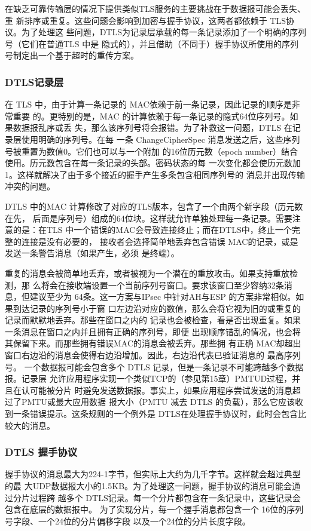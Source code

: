 在缺乏可靠传输层的情况下提供类似TLS服务的主要挑战在于数据报可能会丢失、重
新排序或重复。这些问题会影响到加密与握手协议，这两者都依赖于 TLS协议。为了处理这
些问题，DTLS为记录层承载的每一条记录添加了一个明确的序列号（它们在普通TLS 中是
隐式的），并且借助（不同于）握手协议所使用的序列号制定出一个基于超时的重传方案。
\subsubsection{DTLS记录层}
在 TLS 中，由于计算一条记录的 MAC依赖于前一条记录，因此记录的顺序是非常重要
的。更特别的是，MAC 的计算依赖于每一条记录的隐式64位序列号。如果数据报乱序或丢
失，那么该序列号将会报错。为了补救这一问题，DTLS 在记录层使用明确的序列号。在每
一条 ChangeCipherSpec 消息发送之后，这些序列号被重置为数值0。它们也可以与一个附加
的16位历元数（epoch number）结合使用。历元数包含在每一条记录的头部。密码状态的每
一次变化都会使历元数加1。这样就解决了由于多个接近的握手产生多条包含相同序列号的
消息并出现传输冲突的问题。

DTLS 中的MAC 计算修改了对应的TLS版本，包含了一个由两个新字段（历元数在先，
后面是序列号）组成的64位块。这样就允许单独处理每一条记录。需要注意的是：在TLS
中一个错误的MAC会导致连接终止；而在DTLS中，终止一个完整的连接是没有必要的，
接收者会选择简单地丢弃包含错误 MAC的记录，或是发送一条警告消息（如果产生，必须
是终端）。

重复的消息会被简单地丢弃，或者被视为一个潜在的重放攻击。如果支持重放检测，那
么将会在接收端设置一个当前序列号窗口。要求该窗口至少容纳32条消息，但建议至少为
64条。这一方案与IPsec 中针对AH与ESP 的方案非常相似。如果到达记录的序列号小于窗
口左边沿对应的数值，那么会将它视为旧的或重复的记录而默默地丢弃。那些在窗口之内的
记录也会被检查，看是否出现重复。如果一条消息在窗口之内并且拥有正确的序列号，即便
出现顺序错乱的情况，也会将其保留下来。而那些拥有错误MAC的消息会被丢弃。那些拥
有正确 MAC却超出窗口右边沿的消息会使得右边沿增加。因此，右边沿代表已验证消息的
最高序列号。
一个数据报可能会包含多个 DTLS 记录，但是一条记录不可能跨越多个数据报。记录层
允许应用程序实现一个类似TCP的（参见第15章）PMTUD过程，并且在认可能被分片
时避免发送数据报。事实上，如果应用程序尝试发送的消息超过了PMTU或最大应用数据
报大小（PMTU 减去 DTLS 的负载），那么它应该收到一条错误提示。这条规则的一个例外是
DTLS在处理握手协议时，此时会包含比较大的消息。

\subsubsection{DTLS 握手协议}
握手协议的消息最大为224-1字节，但实际上大约为几千字节。这样就会超过典型的最
大UDP数据报大小的1.5KB。为了处理这一问题，握手协议的消息可能会通过分片过程跨
越多个 DTLS记录。每一个分片都包含在一条记录中，这些记录会包含在底层的数据报中。
为了实现分片，每一个握手消息都包含一个 16位的序列号字段、一个24位的分片偏移字段
以及一个24位的分片长度字段。

